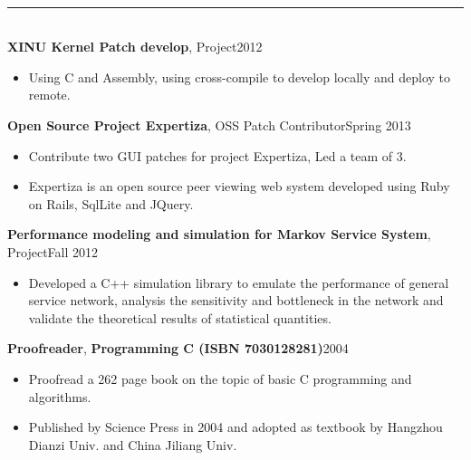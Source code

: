 \documentclass[10pt,oneside,a4paper,draft]{article} %
\newenvironment{CVsection}[1]{
    \hspace*{20pt}{\bf \Large #1}\\[-3pt]
    \rule[5pt]{\textwidth}{1pt}\\
}{
    \hspace{-10pt}\hfill\\[10pt]
}
\newenvironment{CVexperience}[3]{
    {\bf #1}, #2\hfill #3\\[2pt]
    \begin{itemize}
        \setlength{\parsep}{0pt}
        \setlength{\itemsep}{0pt}\vspace{-16pt}
}{
    \end{itemize}
}
\begin{document}
\begin{CVsection}{\Large E\large XPERIENCE}
\begin{CVexperience}{XINU Kernel Patch develop}{Project}{2012}
            \item Using C and Assembly, using cross-compile to develop locally and deploy to remote.
        \end{CVexperience}
        \begin{CVexperience}{Open Source Project Expertiza}{OSS Patch Contributor}{Spring 2013}
            \item Contribute two GUI patches for project Expertiza, Led a team of 3.
            \item Expertiza is an open source peer viewing web system developed using Ruby on Rails, SqlLite and JQuery.
        \end{CVexperience}
        \begin{CVexperience}{Performance modeling and simulation for Markov Service System}{Project}{Fall 2012}
            \item Developed a C++ simulation library to emulate the performance of general service network, analysis the sensitivity and bottleneck in the network and validate the theoretical results of statistical quantities.
        \end{CVexperience}
        \begin{CVexperience}{Proofreader}{{\bf Programming C (ISBN 7030128281)}}{2004}
            \item Proofread a 262 page book on the topic of basic C programming and algorithms.
            \item Published by Science Press in 2004 and adopted as textbook by Hangzhou Dianzi Univ. and China Jiliang Univ.
        \end{CVexperience}
    \end{CVsection}
\end{document}
